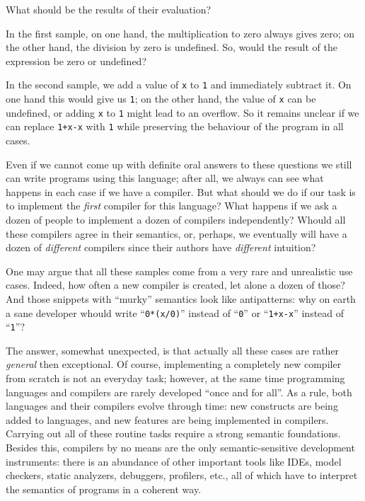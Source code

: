 \documentclass{book}
\begin{document}
What should be the results of their evaluation?

In the first sample, on one hand, the multiplication to zero always gives zero; on the other hand, the division by zero is undefined. So, would the result of
the expression be zero or undefined?

In the second sample, we add a value of \lstinline|x| to \lstinline|1| and immediately subtract it. On one hand this would give us \lstinline|1|; on the
other hand, the value of \lstinline|x| can be undefined, or adding \lstinline|x| to \lstinline|1| might lead to an overflow. So it remains unclear if we
can replace \lstinline|1+x-x| with \lstinline|1| while preserving the behaviour of the program in all cases.

Even if we cannot come up with definite oral answers to these questions we still can write programs using this language; after all, we always can
see what happens in each case if we have a compiler. But what should we do if our task is to implement the \emph{first} compiler for this language?
What happens if we ask a dozen of people to implement a dozen of compilers independently? Whould all these compilers agree in their semantics, or, perhaps, we
eventually will have a dozen of \emph{different} compilers since their authors have \emph{different} intuition? 

One may argue that all these samples come from a very rare and unrealistic use cases. Indeed, how often a new compiler is created, let alone a
dozen of those? And those snippets with ``murky'' semantics look like antipatterns: why on earth a sane developer whould write ``\lstinline|0*(x/0)|''
instead of ``\lstinline|0|'' or ``\lstinline|1+x-x|'' instead of ``\lstinline|1|''?

The answer, somewhat unexpected, is that actually all these cases are rather \emph{general} then exceptional. Of course, implementing a completely new compiler from scratch is not an
everyday task; however, at the same time programming languages and compilers are rarely developed ``once and for all''. As a rule, both languages
and their compilers evolve through time: new constructs are being added to languages, and new features are being implemented in compilers. Carrying out all of
these routine tasks require a strong semantic foundations. Besides this, compilers by no means are the only semantic-sensitive development instruments:
there is an abundance of other important tools like IDEs, model checkers, static analyzers, debuggers, profilers, etc., all of which have to interpret the
semantics of programs in a coherent way.
\end{document}
